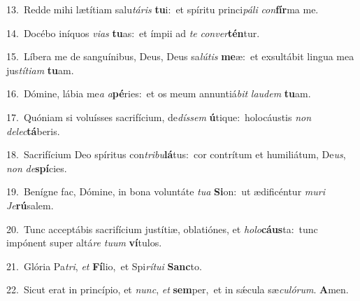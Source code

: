 {\numbfont\textcolor{\numbcolor}{13.}}~Redde mihi lætítiam salu\-\textit{tá}\-\textit{ris} \textbf{tu}\-i:~\star et spíritu princi\-\textit{pá}\-\textit{li} \textit{con}\-\textbf{fír}ma me.\par
{\numbfont\textcolor{\numbcolor}{14.}}~Docébo iníquos \textit{vi}\-\textit{as} \textbf{tu}\-as:~\star et ímpii ad \textit{te} \textit{con}\-\textit{ver}\textbf{tén}tur.\par
{\numbfont\textcolor{\numbcolor}{15.}}~Líbera me de sanguínibus, Deus, Deus sa\-\textit{lú}\-\textit{tis} \textbf{me}\-æ:~\star et exsultábit lingua mea jus\-\textit{tí}\-\textit{ti}\textit{am} \textbf{tu}\-am.\par
{\numbfont\textcolor{\numbcolor}{16.}}~Dómine, lábia me\textit{a} \textit{a}\-\textbf{pé}ries:~\star et os meum annuntiá\textit{bit} \textit{lau}\-\textit{dem} \textbf{tu}\-am.\par
{\numbfont\textcolor{\numbcolor}{17.}}~Quóniam si voluísses sacrifícium, de\-\textit{dís}\-\textit{sem} \textbf{ú}\-tique:~\star holocáustis \textit{non} \textit{de}\-\textit{lec}\textbf{tá}beris.\par
{\numbfont\textcolor{\numbcolor}{18.}}~Sacrifícium Deo spíritus con\-\textit{tri}\-\textit{bu}\textbf{lá}tus:~\star cor contrítum et humiliátum, De\-\textit{us}\-, \textit{non} \textit{de}\-\textbf{spí}cies.\par
{\numbfont\textcolor{\numbcolor}{19.}}~Benígne fac, Dómine, in bona voluntáte \textit{tu}\-\textit{a} \textbf{Si}\-on:~\star ut ædificéntur \textit{mu}\-\textit{ri} \textit{Je}\-\textbf{rú}salem.\par
{\numbfont\textcolor{\numbcolor}{20.}}~Tunc acceptábis sacrifícium justítiæ, oblatiónes, et \textit{ho}\-\textit{lo}\textbf{cáus}ta:~\star tunc impónent super altá\textit{re} \textit{tu}\-\textit{um} \textbf{ví}\-tulos.\par
{\numbfont\textcolor{\numbcolor}{21.}}~Glória Pa\-\textit{tri}\-, \textit{et} \textbf{Fí}\-lio,~\star et Spi\-\textit{rí}\-\textit{tu}\textit{i} \textbf{Sanc}\-to.\par
{\numbfont\textcolor{\numbcolor}{22.}}~Sicut erat in princípio, et \textit{nunc}\-, \textit{et} \textbf{sem}\-per,~\star et in sǽcula sæ\-\textit{cu}\-\textit{ló}\textit{rum}. \textbf{A}\-men.\par
